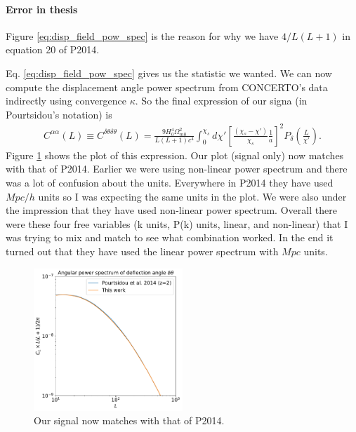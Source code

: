 \documentclass[12pt]{article}
\numberwithin{equation}{section}
\begin{document}
\paragraph{Error in thesis}Figure \eqref{eq:disp_field_pow_spec} is the reason for why we have $ 4/L(L + 1) $ in equation 20 of P2014. 

Eq. \eqref{eq:disp_field_pow_spec} gives us the statistic we wanted. We can now compute the displacement angle power spectrum from CONCERTO's data indirectly using convergence $\kappa$. So the final expression of our signa (in Pourtsidou's notation) is 
\begin{align}
C^{\alpha\alpha}(L) \equiv C^{\delta\theta\delta\theta}(L) = \frac{9 H_0^4 \Omega_{m0}^2}{L(L+1)c^4}  \int_0^{\chi_s} d\chi' \left[ \frac{(\chi_s - \chi')}{\chi_s} \frac{1}{a} \right]^2 P_\delta\left( \frac{L}{\chi'}\right).\label{eq:signal}
\end{align}
Figure \ref{fig:signal} shows the plot of this expression. Our plot (signal only) now matches with that of P2014. Earlier we were using non-linear power spectrum and there was a lot of confusion about the units. Everywhere in P2014 they have used  $ Mpc/h $ units so I was expecting the same units in the plot. We were also under the impression that they have used non-linear power spectrum. Overall there were these four free variables (k units, P(k) units, linear, and non-linear) that I was trying to mix and match to see what combination worked. In the end it turned out that they have used the linear power spectrum with $ Mpc $ units.
\begin{figure}[tbp]
	\centering
	\includegraphics[width=0.5\textwidth]{c_l_z_2_lmax_50000_j_max_1}
	\caption{Our signal now matches with that of P2014.}
	\label{fig:signal}
\end{figure}
\end{document}
